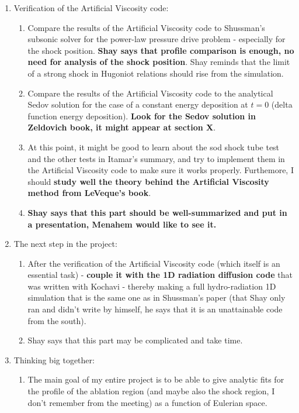 \documentclass[11pt]{article}
\begin{document}
\begin{enumerate}
\begin{enumerate}
\begin{enumerate}
        \end{enumerate} 
        \item Verification of the Artificial Viscosity code:
        \begin{enumerate}
            \item Compare the results of the Artificial Viscosity code to Shussman's subsonic solver for the power-law pressure drive problem - especially for the shock position. \textbf{Shay says that profile comparison is enough, no need for analysis of the shock position}. Shay reminds that the limit of a strong shock in Hugoniot relations should rise from the simulation.
            \item Compare the results of the Artificial Viscosity code to the analytical Sedov solution for the case of a constant energy deposition at $t=0$ (delta function energy deposition). \textbf{Look for the Sedov solution in Zeldovich book, it might appear at section X}.
            \item At this point, it might be good to learn about the sod shock tube test and the other tests in Itamar's summary, and try to implement them in the Artificial Viscosity code to make sure it works properly. Furthemore, I should \textbf{study well the theory behind the Artificial Viscosity method from LeVeque's book}.
            \item \textbf{Shay says that this part should be well-summarized and put in a presentation, Menahem would like to see it.}
        \end{enumerate}
        \item The next step in the project:
        \begin{enumerate}
            \item After the verification of the Artificial Viscosity code (which itself is an essential task) - \textbf{couple it with the 1D radiation diffusion code} that was written with Kochavi - thereby making a full hydro-radiation 1D simulation that is the same one as in Shussman's paper (that Shay only ran and didn't write by himself, he says that it is an unattainable code from the south).
            \item Shay says that this part may be complicated and take time.
        \end{enumerate}
        \item Thinking big together:
        \begin{enumerate}
            \item The main goal of my entire project is to be able to give analytic fits for the profile of the ablation region (and maybe also the shock region, I don't remember from the meeting) as a function of Eulerian space.

\end{enumerate}
\end{enumerate}
\end{enumerate}
\end{document}
